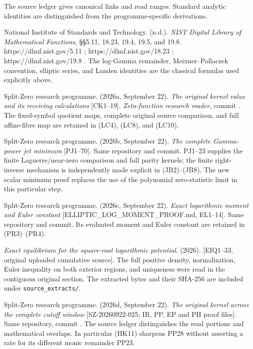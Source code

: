 \documentclass[10pt]{article}
\begin{document}
The source ledger gives canonical links and read ranges. Standard analytic identities are distinguished from the programme-specific derivations.

National Institute of Standards and Technology. (n.d.). \emph{NIST Digital Library of Mathematical Functions}, §§5.11, 18.23, 19.4, 19.5, and 19.8. https://dlmf.nist.gov/5.11 ; https://dlmf.nist.gov/18.23 ; https://dlmf.nist.gov/19.8 . The log-Gamma remainder, Meixner--Pollaczek convention, elliptic series, and Landen identities are the classical formulas used explicitly above.

Split-Zero research programme. (2026a, September 22). \emph{The original kernel value and its receiving calculations} {[}CK1--19{]}. \emph{Zeta-function research reader}, commit . The fixed-symbol quotient maps, complete original source comparison, and full affine-fibre map are retained in (LC4), (LC8), and (LC10).

Split-Zero research programme. (2026b, September 22). \emph{The complete Gamma-power jet minimum} {[}PJ1--70{]}. Same repository and commit. PJ1--23 supplies the finite Laguerre/near-zero comparison and full parity kernels; the finite right-inverse mechanism is independently made explicit in (JB2)--(JB8). The new scalar minimum proof replaces the use of the polynomial zero-statistic limit in this particular step.

Split-Zero research programme. (2026c, September 22). \emph{Exact logarithmic moment and Euler constant} {[}ELLIPTIC\_LOG\_MOMENT\_PROOF.md, EL1--14{]}. Same repository and commit. Its evaluated moment and Euler constant are retained in (PR3)--(PR4).

\emph{Exact equilibrium for the square-root logarithmic potential}. (2026). {[}EIQ1--33, original uploaded cumulative source{]}. The full positive density, normalization, Euler inequality on both exterior regions, and uniqueness were read in the contiguous original section. The extracted bytes and their SHA-256 are included under \texttt{source\_extracts/}.

Split-Zero research programme. (2026d, September 22). \emph{The original kernel across the complete cutoff window} {[}SZ-20260922-025; IR, PP, EP and PH proof files{]}. Same repository, commit . The source ledger distinguishes the read portions and mathematical overlaps. In particular (HK11) sharpens PP28 without asserting a rate for its different monic remainder PP23.
\end{document}
